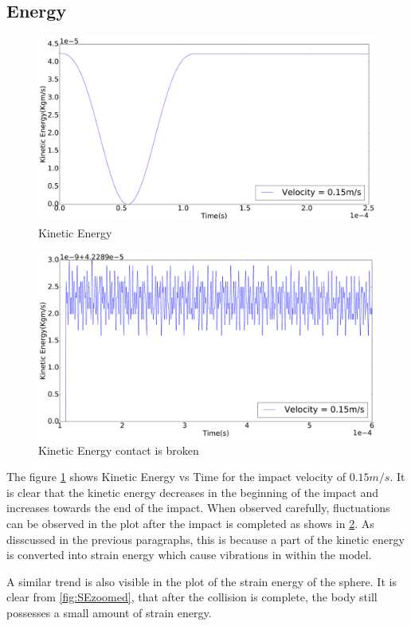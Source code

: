 \subsection{Energy}
\begin{figure}[H]
\includegraphics[width=1.0\textwidth]{../images/KE/KE_pdf.pdf}
\caption{Kinetic Energy}
\label{fig:KE}
\end{figure}
\begin{figure}[H]
\includegraphics[width=1.0\textwidth]{../images/KE/KEzoomed_pdf.pdf}
\caption{Kinetic Energy contact is broken}
\label{fig:KEzoomed}
\end{figure}
The figure \ref{fig:KE} shows Kinetic Energy vs Time for the impact velocity of $0.15m/s$. It is clear that the kinetic energy decreases in the beginning of the impact and increases towards the end of the impact. When observed carefully, fluctuations can be observed in the plot after the impact is completed as shows in \ref{fig:KEzoomed}. As disscussed in the previous paragraphs, this is because a part of the kinetic energy is converted into strain energy which cause vibrations in within the model.

A similar trend is also visible in the plot of the strain energy of the sphere. It is clear from \ref{fig:SEzoomed}, that after the collision is complete, the body still possesses a small amount of strain energy.

